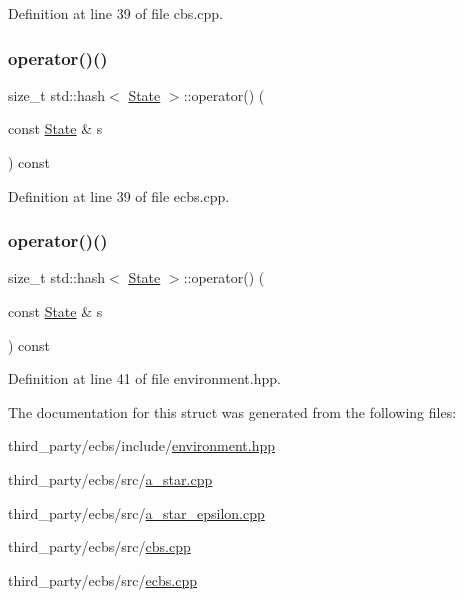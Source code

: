 Definition at line 39 of file cbs.\+cpp.

\mbox{\label{structstd_1_1hash_3_01_state_01_4_af7fa7225302eecf4b97ebb57bcaf3b70}} 
\subsubsection{\texorpdfstring{operator()()}{operator()()}\hspace{0.1cm}{\footnotesize\ttfamily [4/5]}}
{\footnotesize\ttfamily size\+\_\+t std\+::hash$<$ \hyperlink{struct_state}{State} $>$\+::operator() (\begin{DoxyParamCaption}\item[{const \hyperlink{struct_state}{State} \&}]{s }\end{DoxyParamCaption}) const\hspace{0.3cm}{\ttfamily [inline]}}



Definition at line 39 of file ecbs.\+cpp.

\mbox{\label{structstd_1_1hash_3_01_state_01_4_af7fa7225302eecf4b97ebb57bcaf3b70}} 
\subsubsection{\texorpdfstring{operator()()}{operator()()}\hspace{0.1cm}{\footnotesize\ttfamily [5/5]}}
{\footnotesize\ttfamily size\+\_\+t std\+::hash$<$ \hyperlink{structlib_multi_robot_planning_1_1_state}{State} $>$\+::operator() (\begin{DoxyParamCaption}\item[{const \hyperlink{structlib_multi_robot_planning_1_1_state}{State} \&}]{s }\end{DoxyParamCaption}) const\hspace{0.3cm}{\ttfamily [inline]}}



Definition at line 41 of file environment.\+hpp.



The documentation for this struct was generated from the following files\+:\begin{DoxyCompactItemize}
\item 
third\+\_\+party/ecbs/include/\hyperlink{environment_8hpp}{environment.\+hpp}\item 
third\+\_\+party/ecbs/src/\hyperlink{a__star_8cpp}{a\+\_\+star.\+cpp}\item 
third\+\_\+party/ecbs/src/\hyperlink{a__star__epsilon_8cpp}{a\+\_\+star\+\_\+epsilon.\+cpp}\item 
third\+\_\+party/ecbs/src/\hyperlink{cbs_8cpp}{cbs.\+cpp}\item 
third\+\_\+party/ecbs/src/\hyperlink{ecbs_8cpp}{ecbs.\+cpp}\end{DoxyCompactItemize}
